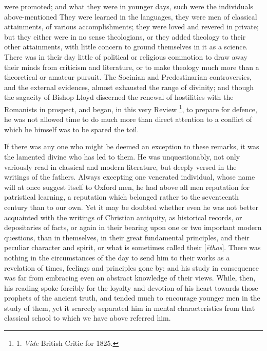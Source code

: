 were promoted; and what they were in younger days, such were the
individuals above-mentioned They were learned in the languages, they
were men of classical attainments, of various accomplishments; they were
loved and revered in private; but they either were in no sense
theologians, or they added theology to their other attainments, with
little concern to ground themselves in it as a science. There was in
their day little of political or religious commotion to draw away their
minds from criticism and literature, or to make theology much more than
a theoretical or amateur pursuit. The Socinian and Predestinarian
controversies, and the external evidences, almost exhausted the range of
divinity; and though the sagacity of Bishop Lloyd discerned the renewal
of hostilities with the Romanists in prospect, and began, in this very
Review \footnote{1. \emph{Vide}
British Critic for 1825.}, to prepare for defence, he was not allowed time to do
much more than direct attention to a conflict of which he himself was to
be spared the toil.

If there
was any one who might be deemed an exception to these remarks, it was
the lamented divine who has led to them. He was unquestionably, not only
variously read in classical and modern literature, but deeply versed in
the writings of the fathers. Always excepting one venerated individual,
whose name will at once suggest itself to Oxford men, he had above all
men reputation for patristical learning, a reputation which belonged
rather to the seventeenth century than to our own. Yet it may be doubted
whether even he was not better acquainted with the writings of Christian
antiquity, as historical records, or depositaries of facts, or again in
their bearing upon one or two important modern questions, than in
themselves, in their great fundamental principles, and their peculiar
character and spirit, or what is sometimes called their [\emph{\={e}thos}].
There was nothing in the circumstances of the day to send him to their
works as a revelation of times, feelings and principles gone by; and his
study in consequence was far from embracing even an abstract knowledge
of their views. While, then, his reading spoke forcibly for the loyalty
and devotion of his heart towards those prophets of the ancient truth,
and tended much to encourage younger men in the study of them, yet it
scarcely separated him in mental characteristics from that classical
school to which we have above referred him.

